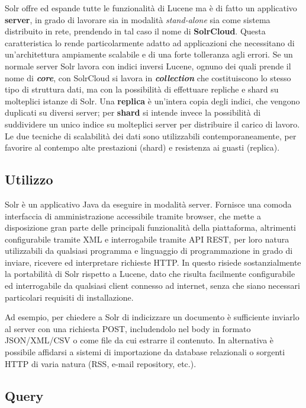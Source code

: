 Solr offre ed espande tutte le funzionalità di Lucene ma è di fatto un applicativo \textbf{server}, in grado di lavorare sia in modalità \textit{stand-alone} sia come sistema distribuito in rete, prendendo in tal caso il nome di \textbf{SolrCloud}. Questa caratteristica lo rende particolarmente adatto ad applicazioni che necessitano di un’architettura ampiamente scalabile e di una forte tolleranza agli errori. Se un normale server Solr lavora con indici inversi Lucene, ognuno dei quali prende il nome di \textbf{\textit{core}}, con SolrCloud si lavora in \textit{\textbf{collection}} che costituiscono lo stesso tipo di struttura dati, ma con la possibilità di effettuare repliche e shard su molteplici istanze di Solr. Una \textbf{replica} è un’intera copia degli indici, che vengono duplicati su diversi server; per \textbf{shard} si intende invece la possibilità di suddividere un unico indice su molteplici server per distribuire il carico di lavoro. Le due tecniche di scalabilità dei dati sono utilizzabili contemporaneamente, per favorire al contempo alte prestazioni (shard) e resistenza ai guasti (replica).



\subsection{Utilizzo}

Solr è un applicativo Java da eseguire in modalità server.
Fornisce una comoda interfaccia di amministrazione accessibile tramite browser, che mette a disposizione gran parte delle principali funzionalità della piattaforma, altrimenti configurabile tramite XML e interrogabile tramite API REST, per loro natura utilizzabili da qualsiasi programma e linguaggio di programmazione in grado di inviare, ricevere ed interpretare richieste HTTP. In questo risiede sostanzialmente la portabilità di Solr rispetto a Lucene, dato che risulta facilmente configurabile ed interrogabile da qualsiasi client connesso ad internet, senza che siano necessari particolari requisiti di installazione.

Ad esempio, per chiedere a Solr di indicizzare un documento è sufficiente inviarlo al server con una richiesta POST, includendolo nel body in formato JSON/XML/CSV o come file da cui estrarre il contenuto. In alternativa è possibile affidarsi a sistemi di importazione da database relazionali o sorgenti HTTP di varia natura (RSS, e-mail repository, etc.).



\subsection{Query}

